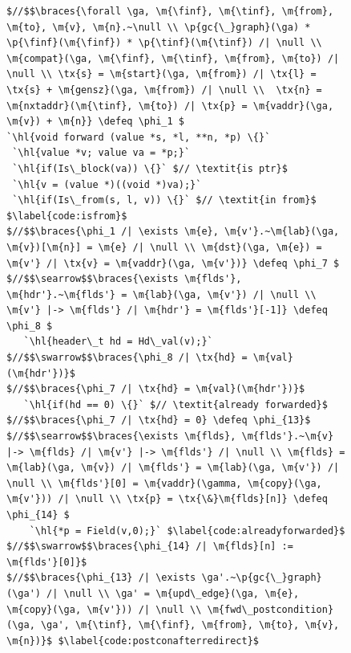 \documentclass[acmsmall,screen]{acmart}
\makeatletter
\newcommand{\finf}{finf}
\newcommand{\tinf}{tinf}
\newcommand{\braces}[1]{\left\{\!\!\!\begin{array}{l@{}} #1 \end{array}\right\}}
\newcommand{\ga}{\gamma}
\newcommand{\defeq}{\mathbin{\stackrel{\triangle}{=}}}
\newcommand{\tx}[1]{\text{#1}}
\newcommand{\p}[1]{\ensuremath{\mathsf{#1}}} \newcommand{\m}[1]{\ensuremath{\mathit{#1}}} \newcommand{\ma}[1]{\ensuremath{\mathcal{#1}}} \let\ramify\lightning
\newcommand{\hl}[1]{\colorbox{lightgray}{#1}}
\makeatother
\begin{document}
\begin{figure}[!ht]
\vspace{-1ex}
  \begin{lstlisting}[multicols=2]
$//$$\braces{\forall \ga, \m{\finf}, \m{\tinf}, \m{from}, \m{to}, \m{v}, \m{n}.~\null \\ \p{gc{\_}graph}(\ga) * \p{\finf}(\m{\finf}) * \p{\tinf}(\m{\tinf}) /| \null \\ \m{compat}(\ga, \m{\finf}, \m{\tinf}, \m{from}, \m{to}) /| \null \\ \tx{s} = \m{start}(\ga, \m{from}) /| \tx{l} = \tx{s} + \m{gensz}(\ga, \m{from}) /| \null \\  \tx{n} = \m{nxtaddr}(\m{\tinf}, \m{to}) /| \tx{p} = \m{vaddr}(\ga, \m{v}) + \m{n}} \defeq \phi_1 $
`\hl{void forward (value *s, *l, **n, *p) \{}`
 `\hl{value *v; value va = *p;}` 
 `\hl{if(Is\_block(va)) \{}` $// \textit{is ptr}$
 `\hl{v = (value *)((void *)va);}` 
 `\hl{if(Is\_from(s, l, v)) \{}` $// \textit{in from}$ $\label{code:isfrom}$
$//$$\braces{\phi_1 /| \exists \m{e}, \m{v'}.~\m{lab}(\ga, \m{v})[\m{n}] = \m{e} /| \null \\ \m{dst}(\ga, \m{e}) = \m{v'} /| \tx{v} = \m{vaddr}(\ga, \m{v'})} \defeq \phi_7 $
$//$$\searrow$$\braces{\exists \m{flds'}, \m{hdr'}.~\m{flds'} = \m{lab}(\ga, \m{v'}) /| \null \\ \m{v'} |-> \m{flds'} /| \m{hdr'} = \m{flds'}[-1]} \defeq \phi_8 $
   `\hl{header\_t hd = Hd\_val(v);}`
$//$$\swarrow$$\braces{\phi_8 /| \tx{hd} = \m{val}(\m{hdr'})}$
$//$$\braces{\phi_7 /| \tx{hd} = \m{val}(\m{hdr'})}$ 
   `\hl{if(hd == 0) \{}` $// \textit{already forwarded}$
$//$$\braces{\phi_7 /| \tx{hd} = 0} \defeq \phi_{13}$ 
$//$$\searrow$$\braces{\exists \m{flds}, \m{flds'}.~\m{v} |-> \m{flds} /| \m{v'} |-> \m{flds'} /| \null \\ \m{flds} = \m{lab}(\ga, \m{v}) /| \m{flds'} = \m{lab}(\ga, \m{v'}) /| \null \\ \m{flds'}[0] = \m{vaddr}(\gamma, \m{copy}(\ga, \m{v'})) /| \null \\ \tx{p} = \tx{\&}\m{flds}[n]} \defeq \phi_{14} $
    `\hl{*p = Field(v,0);}` $\label{code:alreadyforwarded}$
$//$$\swarrow$$\braces{\phi_{14} /| \m{flds}[n] := \m{flds'}[0]}$
$//$$\braces{\phi_{13} /| \exists \ga'.~\p{gc{\_}graph}(\ga') /| \null \\ \ga' = \m{upd\_edge}(\ga, \m{e}, \m{copy}(\ga, \m{v'})) /| \null \\ \m{fwd\_postcondition}(\ga, \ga', \m{\tinf}, \m{\finf}, \m{from}, \m{to}, \m{v}, \m{n})}$ $\label{code:postconafterredirect}$

\end{lstlisting}
\end{figure}
\end{document}
